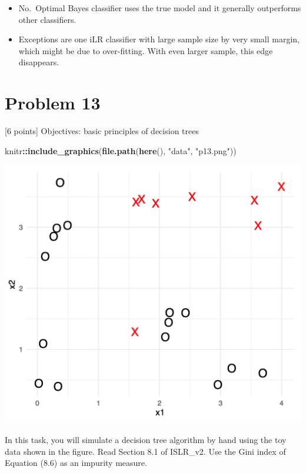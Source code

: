 \documentclass[
]{article}
\newenvironment{Shaded}{\begin{snugshade}}{\end{snugshade}}
\newcommand{\FunctionTok}[1]{\textcolor[rgb]{0.13,0.29,0.53}{\textbf{#1}}}
\newcommand{\NormalTok}[1]{#1}
\newcommand{\SpecialCharTok}[1]{\textcolor[rgb]{0.81,0.36,0.00}{\textbf{#1}}}
\newcommand{\StringTok}[1]{\textcolor[rgb]{0.31,0.60,0.02}{#1}}
\begin{document}
\begin{itemize}
\item
  No.~Optimal Bayes classifier uses the true model and it generally
  outperforms other classifiers.
\item
  Exceptions are one iLR classifier with large sample size by very small
  margin, which might be due to over-fitting. With even larger sample,
  this edge disappears.
\end{itemize}

\hypertarget{problem-13}{%
\section{Problem 13}\label{problem-13}}

{[}6 points{]} Objectives: basic principles of decision trees

\begin{Shaded}
\begin{Highlighting}[]
\NormalTok{knitr}\SpecialCharTok{::}\FunctionTok{include\_graphics}\NormalTok{(}\FunctionTok{file.path}\NormalTok{(}\FunctionTok{here}\NormalTok{(), }\StringTok{"data"}\NormalTok{, }\StringTok{"p13.png"}\NormalTok{)) }
\end{Highlighting}
\end{Shaded}

\includegraphics[width=16.06in]{data/p13}

In this task, you will simulate a decision tree algorithm by hand using
the toy data shown in the figure. Read Section 8.1 of ISLR\_v2. Use the
Gini index of Equation (8.6) as an impurity measure.
\end{document}
